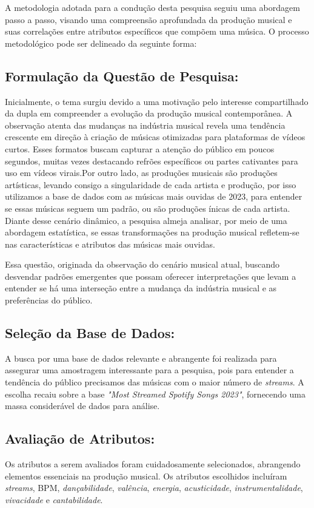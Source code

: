 \documentclass[12pt]{article}
\begin{document}
A metodologia adotada para a condução desta pesquisa seguiu uma abordagem passo a passo, visando uma compreensão aprofundada da produção musical e suas correlações entre atributos específicos que compõem uma música. O processo metodológico pode ser delineado da seguinte forma:

\subsection{Formulação da Questão de Pesquisa:}
Inicialmente, o tema surgiu devido a uma motivação pelo interesse compartilhado da dupla em compreender a evolução da produção musical contemporânea. A observação atenta das mudanças na indústria musical revela uma tendência crescente em direção à criação de músicas otimizadas para plataformas de vídeos curtos. Esses formatos buscam capturar a atenção do público em poucos segundos, muitas vezes destacando refrões específicos ou partes cativantes para uso em vídeos virais.Por outro lado, as produções musicais são produções artísticas, levando consigo a singularidade de cada artista e produção, por isso utilizamos a base de dados com as músicas mais ouvidas de 2023, para entender se essas músicas seguem um padrão, ou são produções ínicas de cada artista. Diante desse cenário dinâmico, a pesquisa almeja analisar, por meio de uma abordagem estatística, se essas transformações na produção musical refletem-se nas características e atributos das músicas mais ouvidas. 

Essa questão, originada da observação do cenário musical atual, buscando desvendar padrões emergentes que possam oferecer interpretações que levam a entender se há uma interseção entre a mudança da indústria musical e as preferências do público.

 
\subsection{Seleção da Base de Dados:}
A busca por uma base de dados relevante e abrangente foi realizada para assegurar uma amostragem interessante para a pesquisa, pois para entender a tendência do público precisamos das músicas com o maior número de \textit{streams}. A escolha recaiu sobre a base \textit{"Most Streamed Spotify Songs 2023"}, fornecendo uma massa considerável de dados para análise\cite{kaggle-spotify}.

\subsection{Avaliação de Atributos:}
Os atributos a serem avaliados foram cuidadosamente selecionados, abrangendo elementos essenciais na produção musical. Os atributos escolhidos incluíram \textit{streams}, BPM, \textit{dançabilidade}, \textit{valência}, \textit{energia}, \textit{acusticidade}, \textit{instrumentalidade}, \textit{vivacidade} e \textit{cantabilidade}.
\end{document}
